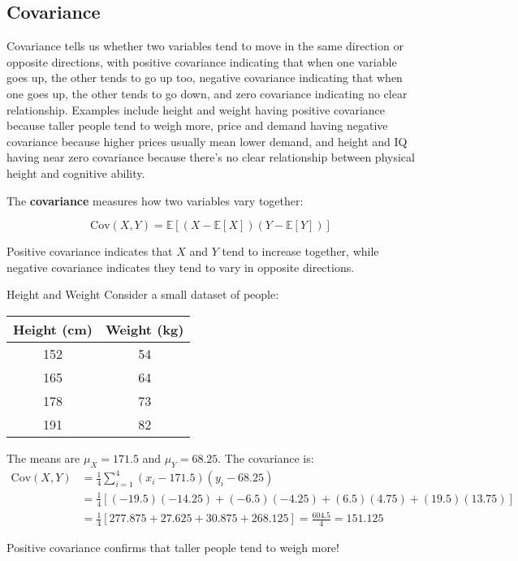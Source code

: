 \subsection{Covariance}

Covariance tells us whether two variables tend to move in the same direction or opposite directions, with positive covariance indicating that when one variable goes up, the other tends to go up too, negative covariance indicating that when one goes up, the other tends to go down, and zero covariance indicating no clear relationship. Examples include height and weight having positive covariance because taller people tend to weigh more, price and demand having negative covariance because higher prices usually mean lower demand, and height and IQ having near zero covariance because there's no clear relationship between physical height and cognitive ability.

The \textbf{covariance} measures how two variables vary together:

\begin{equation}
\text{Cov}(X, Y) = \mathbb{E}[(X - \mathbb{E}[X])(Y - \mathbb{E}[Y])]
\end{equation}

Positive covariance indicates that $X$ and $Y$ tend to increase together, while negative covariance indicates they tend to vary in opposite directions.

\begin{examplebox}{Height and Weight}
Consider a small dataset of people:
\begin{center}
\begin{tabular}{|c|c|}
\hline
Height (cm) & Weight (kg) \\
\hline
152 & 54 \\
165 & 64 \\
178 & 73 \\
191 & 82 \\
\hline
\end{tabular}
\end{center}

The means are $\mu_X = 171.5$ and $\mu_Y = 68.25$. The covariance is:
\begin{align}
\text{Cov}(X,Y) &= \frac{1}{4}\sum_{i=1}^{4}(x_i - 171.5)(y_i - 68.25) \\
&= \frac{1}{4}[(-19.5)(-14.25) + (-6.5)(-4.25) + (6.5)(4.75) + (19.5)(13.75)] \\
&= \frac{1}{4}[277.875 + 27.625 + 30.875 + 268.125] = \frac{604.5}{4} = 151.125
\end{align}

Positive covariance confirms that taller people tend to weigh more!
\end{examplebox}

